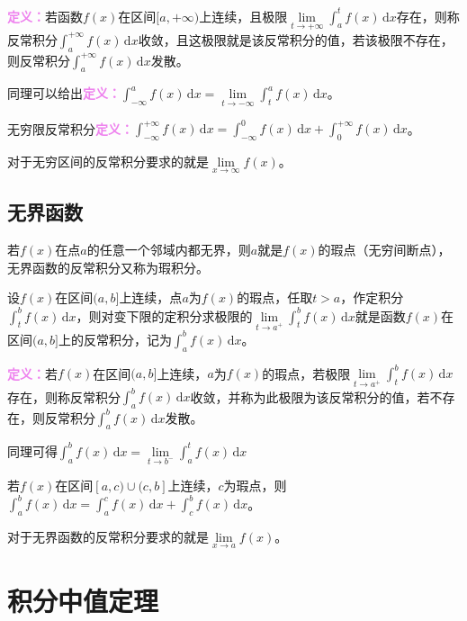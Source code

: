 \documentclass[UTF8, 12pt]{ctexart}
\begin{document}
        \textcolor{violet}{\textbf{定义：}}若函数$f(x)$在区间$[a,+\infty)$上连续，且极限$\lim\limits_{t\to+\infty}\int_a^tf(x)\,\textrm{d}x$存在，则称反常积分$\int_a^{+\infty}f(x)\,\textrm{d}x$收敛，且这极限就是该反常积分的值，若该极限不存在，则反常积分$\int_a^{+\infty}f(x)\,\textrm{d}x$发散。

        同理可以给出\textcolor{violet}{\textbf{定义：}}$\int_{-\infty}^af(x)\,\textrm{d}x=\lim\limits_{t\to-\infty}\int_t^af(x)\,\textrm{d}x$。

        无穷限反常积分\textcolor{violet}{\textbf{定义：}}$\int_{-\infty}^{+\infty}f(x)\,\textrm{d}x=\int_{-\infty}^0f(x)\,\textrm{d}x+\int_0^{+\infty}f(x)\,\textrm{d}x$。

        对于无穷区间的反常积分要求的就是$\lim\limits_{x\to\infty}f(x)$。

        \subsection{无界函数}

        若$f(x)$在点$a$的任意一个邻域内都无界，则$a$就是$f(x)$的瑕点（无穷间断点），无界函数的反常积分又称为瑕积分。

        设$f(x)$在区间$(a,b]$上连续，点$a$为$f(x)$的瑕点，任取$t>a$，作定积分$\int_t^bf(x)\,\textrm{d}x$，则对变下限的定积分求极限的$\lim\limits_{t\to a^+}\int_t^bf(x)\,\textrm{d}x$就是函数$f(x)$在区间$(a,b]$上的反常积分，记为$\int_a^bf(x)\,\textrm{d}x$。

        \textcolor{violet}{\textbf{定义：}}若$f(x)$在区间$(a,b]$上连续，$a$为$f(x)$的瑕点，若极限$\lim\limits_{t\to a^+}\int_t^bf(x)\,\textrm{d}x$存在，则称反常积分$\int_a^bf(x)\,\textrm{d}x$收敛，并称为此极限为该反常积分的值，若不存在，则反常积分$\int_a^bf(x)\,\textrm{d}x$发散。

        同理可得$\int_a^bf(x)\,\textrm{d}x=\lim\limits_{t\to b^-}\int_a^tf(x)\,\textrm{d}x$

        若$f(x)$在区间$[a,c)\cup(c,b]$上连续，$c$为瑕点，则$\int_a^bf(x)\,\textrm{d}x=\int_a^cf(x)\,\textrm{d}x+\int_c^bf(x)\,\textrm{d}x$。

        对于无界函数的反常积分要求的就是$\lim\limits_{x\to a}f(x)$。


        \section{积分中值定理}
\end{document}

